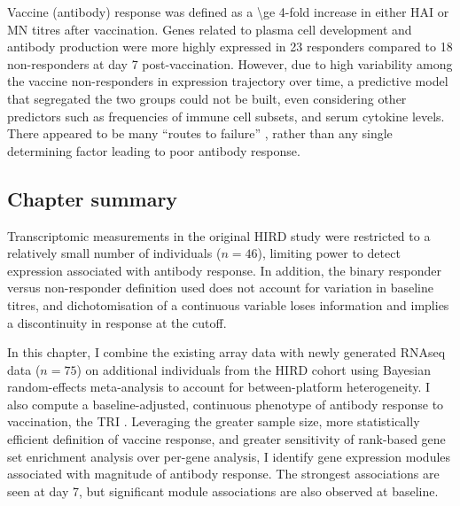 Vaccine (antibody) response was defined as a \num{\ge 4}-fold increase in either \gls{HAI} or \gls{MN} titres after vaccination.
Genes related to plasma cell development and antibody production were more highly expressed in 23 responders compared to 18 non-responders at day 7 post-vaccination.
However, due to high variability among the vaccine non-responders in expression trajectory over time, 
a predictive model that segregated the two groups could not be built,
even considering other predictors such as frequencies of immune cell subsets, and serum cytokine levels.
There appeared to be many \enquote{routes to failure} \autocite{sobolev2016AdjuvantedInfluenzaH1N1Vaccination}, rather than any single determining factor leading to poor antibody response.

\subsection{Chapter summary}

Transcriptomic measurements in the original \gls{HIRD} study were restricted to a relatively small number of individuals ($n=46$), limiting power to detect expression associated with antibody response.
In addition, the binary responder versus non-responder definition used does not account for variation in baseline titres,
and dichotomisation of a continuous variable loses information and implies a discontinuity in response at the cutoff.

In this chapter, I combine the existing array data with newly generated \gls{RNAseq} data ($n=75$) on additional individuals from the \gls{HIRD} cohort using Bayesian random-effects meta-analysis to account for between-platform heterogeneity.
I also compute a baseline-adjusted, continuous phenotype of antibody response to vaccination, the \gls{TRI} \autocite{bucasas2011EarlyPatternsGene}.
Leveraging the greater sample size,
more statistically efficient definition of vaccine response,
and greater sensitivity of rank-based gene set enrichment analysis over per-gene analysis,
I identify gene expression modules associated with magnitude of antibody response.
The strongest associations are seen at day 7, but significant module associations are also observed at baseline.

